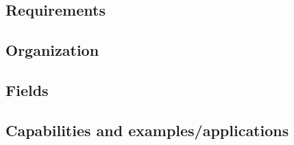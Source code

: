 \documentclass[12pt]{scrartcl}
\begin{document}
      \subsection{Requirements}
      
      
      
      \subsection{Organization}
        
        
        
        
      
      \subsection{Fields}
      
      
    
      \subsection{Capabilities and examples/applications}
  
\end{document}
